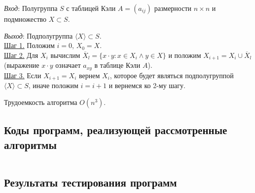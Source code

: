 \documentclass[spec, och, labwork]{shiza}
\begin{document}
        \textit{Вход}: Полугруппа $S$ с таблицей Кэли $A = (a_{ij})$ размерности $n \times n$ и подмножество $X \subset S$.

        \textit{Выход}: Подполугруппа $\langle X \rangle \subset S$.\\
        \underline{Шаг 1.} Положим $i = 0$, $X_0 = X$.\\
        \underline{Шаг 2.} Для $X_i$ вычислим $\overline{X}_l = \{x \cdot y : x \in X_i \wedge y \in X \}$ и положим $X_{i + 1} = X_i \cup \overline{X}_l$ (выражение $x \cdot y$ означает $a_{xy}$ в таблице Кэли $A$). \\
        \underline{Шаг 3.} Если $X_{i + 1} = X_i$ вернем $X_i$, которое будет являться подполугруппой $\langle X \rangle \subset S$, иначе положим $i=i+1$ и вернемся ко 2-му шагу.
    
        Трудоемкость алгоритма $O(n^3)$.
    
        \subsection{Коды программ, реализующей рассмотренные алгоритмы}
            \inputminted[fontsize=\small]{python}{../code/lab4.py}
        \subsection{Результаты тестирования программ}
\end{document}
